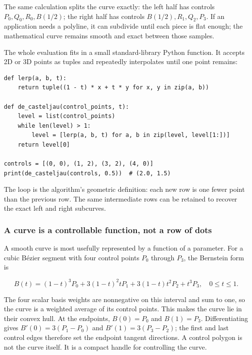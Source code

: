 The same calculation splits the curve exactly: the left half has controls \(P_0,Q_0,R_0,B(1/2)\); the right half has controls \(B(1/2),R_1,Q_2,P_3\). If an application needs a polyline, it can subdivide until each piece is flat enough; the mathematical curve remains smooth and exact between those samples.

The whole evaluation fits in a small standard-library Python function. It accepts 2D or 3D points as tuples and repeatedly interpolates until one point remains:

\begin{verbatim}
def lerp(a, b, t):
    return tuple((1 - t) * x + t * y for x, y in zip(a, b))

def de_casteljau(control_points, t):
    level = list(control_points)
    while len(level) > 1:
        level = [lerp(a, b, t) for a, b in zip(level, level[1:])]
    return level[0]

controls = [(0, 0), (1, 2), (3, 2), (4, 0)]
print(de_casteljau(controls, 0.5))  # (2.0, 1.5)
\end{verbatim}

The loop is the algorithm's geometric definition: each new row is one fewer point than the previous row. The same intermediate rows can be retained to recover the exact left and right subcurves.

\subsubsection{A curve is a controllable function, not a row of dots}\label{03-visual-computing-i-ch001-a-curve-is-a-controllable-function-not-a-row-of-dots}

\hypertarget{03-visual-computing-i-ch001-a-curve-is-a-controllable-function-not-a-row-of-dots}{}

A smooth curve is most usefully represented by a function of a parameter. For a cubic Bézier segment with four control points \(P_0\) through \(P_3\), the Bernstein form is

\[
B(t)=(1-t)^3P_0+3(1-t)^2tP_1+3(1-t)t^2P_2+t^3P_3,\quad 0\le t\le1.
\]

The four scalar basis weights are nonnegative on this interval and sum to one, so the curve is a weighted average of its control points. This makes the curve lie in their convex hull. At the endpoints, \(B(0)=P_0\) and \(B(1)=P_3\). Differentiating gives \(B'(0)=3(P_1-P_0)\) and \(B'(1)=3(P_3-P_2)\); the first and last control edges therefore set the endpoint tangent directions. A control polygon is not the curve itself. It is a compact handle for controlling the curve.

